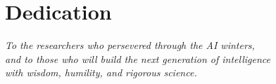 \chapter*{Dedication}
\vspace*{4cm}
\begin{center}
\large
\textit{To the researchers who persevered through the AI winters,} \\
\textit{and to those who will build the next generation of intelligence} \\
\textit{with wisdom, humility, and rigorous science.}
\end{center}